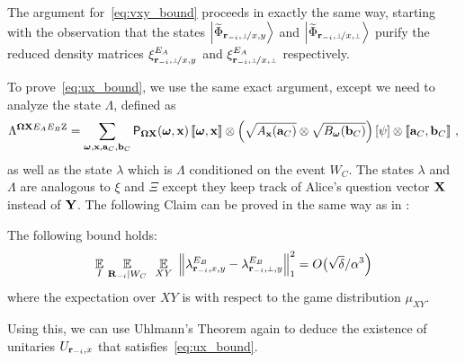 The argument for~\eqref{eq:vxy_bound} proceeds in exactly the same way, starting with the observation that the states $\bigket{\wt{\Phi}_\sspxy}$ and $\bigket{\wt{\Phi}_\sspxp}$ purify the reduced density matrices $\xi^{E_A}_\sspxy$ and $\xi^{E_A}_\sspxp$ respectively. 

To prove~\eqref{eq:ux_bound}, we use the same exact argument, except we need to analyze the state $\Lambda$, defined as
\[
\Lambda^{{\boldsymbol{\Omega}} \mathbf{X} E_AE_B\mathrm{Z}} = \sum_{{\boldsymbol{\omega}}, \mathbf{x}, \mathbf{a}_C, \mathbf{b}_C} \mathsf{P}_{{\boldsymbol{\Omega}} \mathbf{X}} ({\boldsymbol{\omega}}, \mathbf{x}) \, \llbracket {\boldsymbol{\omega}}, \mathbf{x} \rrbracket   \otimes \left (\sqrt{A_{\mathbf{x}}(\mathbf{a}_C)} \otimes \sqrt{B_{{\boldsymbol{\omega}}}(\mathbf{b}_C)} \right ) \left [\psi \right ] \otimes \llbracket \mathbf{a}_C, \mathbf{b}_C \rrbracket~,
\]
as well as the state $\lambda$ which is $\Lambda$ conditioned on the event $W_C$. The states $\lambda$ and $\Lambda$ are analogous to $\xi$ and $\Xi$ except they keep track of Alice's question vector $\mathbf{X}$ instead of $\mathbf{Y}$. The following Claim can be proved in the same way as in :
\begin{claim}\label{claim:yi-change-x}
The following bound holds:
\begin{align}
\label{eq:E_B_1}
\Ex_I \, \Ex_{\bR_\mi |  W_C} \, \, \, \Ex_{XY} \,\, \Big \| \lambda^{E_B}_\ssxy - \lambda^{E_B}_\sspy \Big \|_1^2 = O\big(\sqrt{\delta}/\alpha^3 \Big)
\end{align}
where the expectation over $XY$ is with respect to the game distribution $\mu_{XY}$. 
\end{claim}
Using this, we can use Uhlmann's Theorem again to deduce the existence of unitaries $U_{\mathbf{r}_{-i},x}$ that satisfies~\eqref{eq:ux_bound}. 




